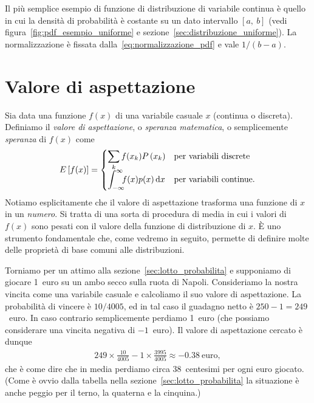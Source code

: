 \begin{examplebox}
  \begin{example}
    Il più semplice esempio di funzione di distribuzione di variabile
    continua è quello in cui la densità di probabilità è costante
    su un dato intervallo $[a,~b]$ (vedi figura~\ref{fig:pdf_esempio_uniforme} e
    sezione~\ref{sec:distribuzione_uniforme}). La normalizzazione è fissata
    dalla~\eqref{eq:normalizzazione_pdf} e vale $1/(b - a)$.
  \end{example}
\end{examplebox}



\section{Valore di aspettazione}

Sia data una funzione $f(x)$ di una variabile casuale $x$ (continua o discreta).
Definiamo il \emph{valore di aspettazione}, o \emph{speranza matematica},
o semplicemente \emph{speranza} di $f(x)$ come
\begin{align}
  \dccases[.]{\expect{f(x)}}%
          {\sum_k f(x_k)\prob{x_k}}%
          {\intinf f(x)p(x)\diff}
\end{align}
Notiamo esplicitamente che il valore di aspettazione trasforma una funzione
di $x$ in un \emph{numero}. Si tratta di una sorta di procedura di media in
cui i valori di $f(x)$ sono pesati con il valore della funzione di distribuzione
di $x$. \`E uno strumento fondamentale che, come vedremo in seguito, permette
di definire molte delle proprietà di base comuni alle distribuzioni.

\begin{examplebox}
  \begin{example}
    Torniamo per un attimo alla sezione~\ref{sec:lotto_probabilita} e supponiamo
    di giocare 1~euro su un ambo secco sulla ruota di Napoli. Consideriamo
    la nostra vincita come una variabile casuale e calcoliamo il suo valore di
    aspettazione. La probabilità di vincere è $10/4005$, ed in tal caso
    il guadagno netto è $250 - 1 = 249$~euro. In caso contrario semplicemente
    perdiamo 1~euro (che possiamo considerare una vincita negativa di
    $-1$~euro). Il valore di aspettazione cercato è dunque
    \begin{align*}
      249 \times \frac{10}{4005} - 1 \times \frac{3995}{4005} \approx
      -0.38~\text{euro},
    \end{align*}
    che è come dire che in media perdiamo circa 38~centesimi per ogni
    euro giocato. (Come è ovvio dalla tabella nella
    sezione~\ref{sec:lotto_probabilita} la situazione è anche peggio
    per il terno, la quaterna e la cinquina.)
  \end{example}
\end{examplebox}

